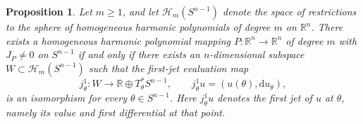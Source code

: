 \documentclass[10pt]{amsart}
\numberwithin{equation}{section}
\newtheorem{proposition}[theorem]{Proposition}
\theoremstyle{definition}
\newcommand{\R}{\mathbb R}
\begin{document}
\begin{proposition}
Let \(m\ge1\), and let \(\mathcal H_m(S^{n-1})\) denote the space of
restrictions to the sphere of homogeneous harmonic polynomials of degree
\(m\) on \(\R^n\). There exists a homogeneous harmonic polynomial mapping
\(P:\R^n\to\R^n\) of degree \(m\) with \(J_P\ne0\) on \(S^{n-1}\) if and only
if there exists an \(n\)-dimensional subspace
\(W\subset\mathcal H_m(S^{n-1})\) such that the first-jet evaluation map
\[
        j^1_\theta:W\longrightarrow\R\oplus T^*_\theta S^{n-1},
        \qquad
        j^1_\theta u=(u(\theta),\mathrm{d}u_\theta),
\]
is an isomorphism for every \(\theta\in S^{n-1}\). Here \(j^1_\theta u\)
denotes the first jet of \(u\) at \(\theta\), namely its value and first
differential at that point.
\end{proposition}
\end{document}
